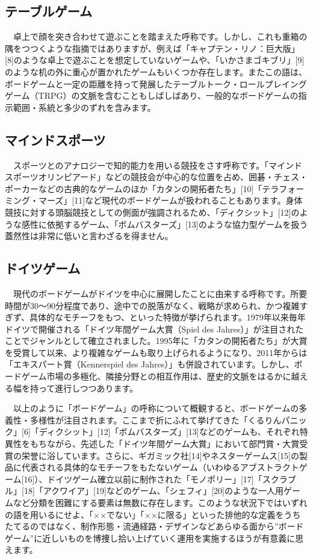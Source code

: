 \subsection{テーブルゲーム}
　卓上で顔を突き合わせて遊ぶことを踏まえた呼称です。しかし、これも重箱の隅をつつくような指摘ではありますが、例えば「キャプテン・リノ：巨大版」[8]のような卓上で遊ぶことを想定していないゲームや、「いかさまゴキブリ」[9]のような机の外に重心が置かれたゲームもいくつか存在します。またこの語は、ボードゲームと一定の距離を持って発展したテーブルトーク・ロールプレイングゲーム（TRPG）の文脈を含むこともしばしばあり、一般的なボードゲームの指示範囲・系統と多少のずれを含みます。

\subsection{マインドスポーツ}
　スポーツとのアナロジーで知的能力を用いる競技をさす呼称です。「マインドスポーツオリンピアード」などの競技会が中心的な位置を占め、囲碁・チェス・ポーカーなどの古典的なゲームのほか「カタンの開拓者たち」[10]「テラフォーミング・マーズ」[11]など現代のボードゲームが扱われることもあります。身体競技に対する頭脳競技としての側面が強調されるため、「ディクシット」[12]のような感性に依拠するゲーム、「ボムバスターズ」[13]のような協力型ゲームを扱う蓋然性は非常に低いと言わざるを得ません。

\subsection{ドイツゲーム}
　現代のボードゲームがドイツを中心に展開したことに由来する呼称です。所要時間が30〜90分程度であり、途中での脱落がなく、戦略が求められ、かつ複雑すぎず、具体的なモチーフをもつ、といった特徴が挙げられます。1979年以来毎年ドイツで開催される「ドイツ年間ゲーム大賞（Spiel des Jahres）」が注目されたことでジャンルとして確立されました。1995年に「カタンの開拓者たち」が大賞を受賞して以来、より複雑なゲームも取り上げられるようになり、2011年からは「エキスパート賞（Kennerspiel des Jahres）」も併設されています。しかし、ボードゲーム市場の多極化、隣接分野との相互作用は、歴史的文脈をはるかに越える幅を持って進行しつつあります。

　以上のように「ボードゲーム」の呼称について概観すると、ボードゲームの多義性・多様性が注目されます。ここまで折にふれて挙げてきた「くるりんパニック」[6]「ディクシット」[12]「ボムバスターズ」[13]などのゲームも、それぞれ特異性をもちながら、先述した「ドイツ年間ゲーム大賞」において部門賞・大賞受賞の栄誉に浴しています。さらに、ギガミック社[14]やネスターゲームス[15]の製品に代表される具体的なモチーフをもたないゲーム（いわゆるアブストラクトゲーム[16]）、ドイツゲーム確立以前に制作された「モノポリー」[17]「スクラブル」[18]「アクワイア」[19]などのゲーム、「シェフィ」[20]のような一人用ゲームなど分類を困難にする要素は無数に存在します。このような状況下ではいずれの語を用いるにせよ、「××でない」「××に限る」といった排他的な定義をうちたてるのではなく、制作形態・流通経路・デザインなどあらゆる面から”ボードゲーム”に近しいものを博捜し拾い上げていく運用を実施するほうが有意義に思えます。

